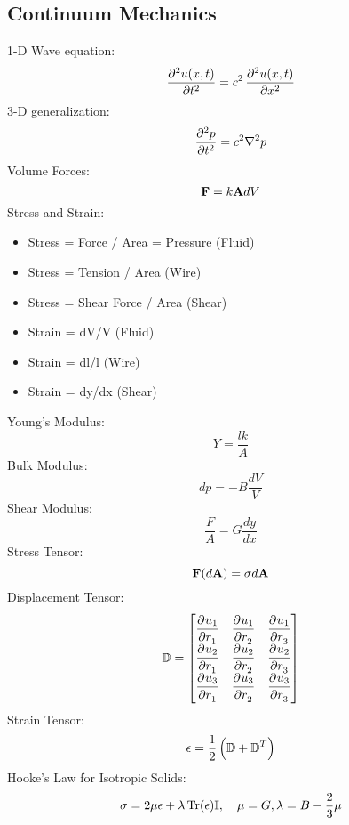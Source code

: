 \subsection{Continuum Mechanics}
1-D Wave equation:
\begin{equation}
    \dpd[2]{u(x, t)}{t} = c^2\dpd[2]{u(x, t)}{x}
\end{equation}
3-D generalization:
\begin{equation}
    \dpd[2]{p}{t} = c^2\nabla^2p
\end{equation}
Volume Forces:
\begin{equation}
    \mathbf{F} = k\mathbf{A}dV
\end{equation}
Stress and Strain:
\begin{itemize}
    \item Stress = Force / Area = Pressure (Fluid)
    \item Stress = Tension / Area (Wire)
    \item Stress = Shear Force / Area (Shear)
    \item Strain = dV/V (Fluid)
    \item Strain = dl/l (Wire)
    \item Strain = dy/dx (Shear)
\end{itemize}
Young's Modulus:
\begin{equation}
    Y = \frac{lk}{A}
\end{equation}
Bulk Modulus:
\begin{equation}
    dp = -B\frac{dV}{V}
\end{equation}
Shear Modulus:
\begin{equation}
    \frac{F}{A} = G\frac{dy}{dx}
\end{equation}
Stress Tensor:
\begin{equation}
    \mathbf{F}(d\mathbf{A}) = \sigma d\mathbf{A}
\end{equation}
Displacement Tensor:
\begin{equation}
    \mathbb{D} = \m{\dpd{u_1}{r_1} & \dpd{u_1}{r_2} & \dpd{u_1}{r_3} \\ \dpd{u_2}{r_1} & \dpd{u_2}{r_2} & \dpd{u_2}{r_3} \\
\dpd{u_3}{r_1} & \dpd{u_3}{r_2} & \dpd{u_3}{r_3}}
\end{equation}
Strain Tensor:
\begin{equation}
    \epsilon = \frac{1}{2}\left(\mathbb{D} + \mathbb{D}^T\right)
\end{equation}
Hooke's Law for Isotropic Solids:
\begin{equation}
    \sigma = 2\mu \epsilon + \lambda \Tr(\epsilon)\mathbb{I}, \quad \mu = G, \lambda = B - \frac{2}{3}\mu
\end{equation}
